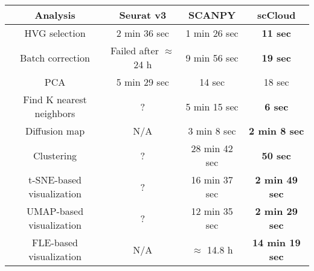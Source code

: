 \documentclass[10pt]{article}
\begin{document}
\begin{table}[H]
	\centering
	\begin{tabular}{|c|c|c|c|}
		\hline
		Analysis & Seurat v3 & SCANPY & scCloud\\
		\hline \hline
		HVG selection & 2 min 36 sec & 1 min 26 sec & \textbf{11 sec} \\
		\hline
		Batch correction & Failed after $\approx$ 24 h & 9 min 56 sec & \textbf{19 sec} \\
		\hline
		PCA & 5 min 29 sec & 14 sec & 18 sec \\
		\hline
		Find K nearest neighbors &  ? &  5 min 15 sec & \textbf{6 sec}\\
		\hline
		Diffusion map & N/A & 3 min 8 sec & \textbf{2 min 8 sec} \\
		\hline 
		Clustering & ? & 28 min 42 sec & \textbf{50 sec}\\
		\hline
		t-SNE-based visualization & ? & 16 min 37 sec & \textbf{2 min 49 sec}\\
		\hline
		UMAP-based visualization & ? & 12 min 35 sec & \textbf{2 min 29 sec}\\
		\hline
		FLE-based visualization & N/A & $\approx$ 14.8  h & \textbf{14 min 19 sec}\\
		\hline
	\end{tabular}
\end{table}
\end{document}
